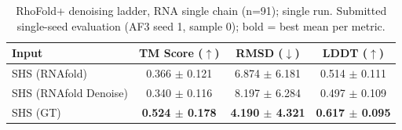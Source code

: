 \begin{table}[htbp]
\centering
\caption{RhoFold+ denoising ladder, RNA single chain (n=91); single run. Submitted single-seed evaluation (AF3 seed 1, sample 0); bold = best mean per metric.}
\label{tab:denoise_main_rf}
\begin{tabular}{lccc}
\toprule
Input & TM Score ($\uparrow$) & RMSD ($\downarrow$) & LDDT ($\uparrow$) \\
\midrule
SHS (RNAfold) & 0.366 $\pm$ 0.121 & 6.874 $\pm$ 6.181 & 0.514 $\pm$ 0.111 \\
SHS (RNAfold Denoise) & 0.340 $\pm$ 0.116 & 8.197 $\pm$ 6.284 & 0.497 $\pm$ 0.109 \\
SHS (GT) & \textbf{0.524 $\pm$ 0.178} & \textbf{4.190 $\pm$ 4.321} & \textbf{0.617 $\pm$ 0.095} \\
\bottomrule
\end{tabular}
\end{table}
